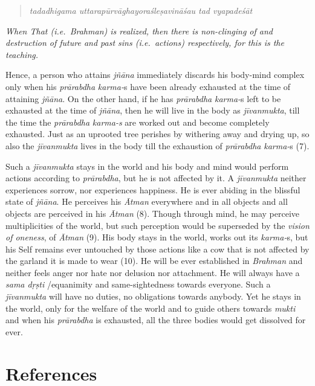 \begin{verse}
\emph{tadadhigama uttarapūrvāghayoraśleṣavināśau tad vyapadeśāt~}
\end{verse}

\emph{When That (i.e.\ Brahman) is realized, then there is non-clinging of and destruction of future and past sins (i.e.\ actions) respectively, for this is the teaching.}

Hence, a person who attains \emph{jñāna} immediately discards his body-mind complex only when his \emph{prārabdha} \emph{karma-}s have been already exhausted at the time of attaining \emph{jñāna}. On the other hand, if he has \emph{prārabdha} \emph{karma-}s left to be exhausted at the time of \emph{jñāna}, then he will live in the body as \emph{jīvanmukta}, till the time the \emph{prārabdha} \emph{karma-s} are worked out and become completely exhausted. Just as an uprooted tree perishes by withering away and drying up, so also the \emph{jīvanmukta} lives in the body till the exhaustion of \emph{prārabdha} \emph{karma-}s (7).

Such a \emph{jīvanmukta} stays in the world and his body and mind would perform actions according to \emph{prārabdha}, but he is not affected by it. A \emph{jīvanmukta} neither experiences sorrow, nor experiences happiness. He is ever abiding in the blissful state of \emph{jñāna}. He perceives his \emph{Ātman} everywhere and in all objects and all objects are perceived in his \emph{Ātman} (8). Though through mind, he may perceive multiplicities of the world, but such perception would be superseded by the \emph{vision of oneness}, of \emph{Ātman} (9). His body stays in the world, works out its \emph{karma-}s, but his Self remains ever untouched by those actions like a cow that is not affected by the garland it is made to wear (10). He will be ever established in \emph{Brahman} and neither feels anger nor hate nor delusion nor attachment. He will always have a \emph{sama dṛṣti} /equanimity and same-sightedness towards everyone. Such a \emph{jīvanmukta} will have no duties, no obligations towards anybody. Yet he stays in the world, only for the welfare of the world and to guide others towards \emph{mukti} and when his \emph{prārabdha} is exhausted, all the three bodies would get dissolved for ever.

\section*{References}

